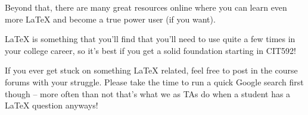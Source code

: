\documentclass{article}
\begin{document}
Beyond that, there are many great resources online where you can learn even
more \LaTeX{} and become a true power user (if you want).

\LaTeX{} is something that you'll find that
you'll need to use quite a few times in your college career, so it's best if you
get a solid foundation starting in CIT592!

If you ever get stuck on something \LaTeX{} \@ related, feel free to post in the course forums with your struggle. Please take the time to run a quick Google search first
though -- more often than not that's what we as TAs do when a student has a \LaTeX{} \@
question anyways!
\end{document}
